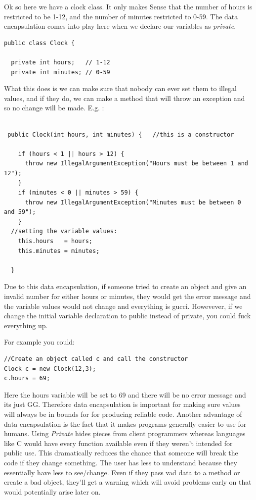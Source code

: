 \documentclass{article}
\begin{document}
Ok so here we have a clock class. It only makes Sense that the number of hours is restricted to be 1-12, and the
number of minutes restricted to 0-59. The data encapsulation comes into play here when we declare our variables 
as \emph{private}. 

\begin{lstlisting}
public class Clock {

  private int hours;   // 1-12
  private int minutes; // 0-59
\end{lstlisting}

What this does is we can make sure that nobody can ever set them to illegal values, and if they do, we can
make a method that will throw an exception and so no change will be made. E.g. :

\begin{lstlisting}

 public Clock(int hours, int minutes) {   //this is a constructor

    if (hours < 1 || hours > 12) {
      throw new IllegalArgumentException("Hours must be between 1 and 12");
    }
    if (minutes < 0 || minutes > 59) {
      throw new IllegalArgumentException("Minutes must be between 0 and 59");
    }
  //setting the variable values:
    this.hours   = hours;	
    this.minutes = minutes;
  
  }       
\end{lstlisting}

Due to this data encapsulation, if someone tried to create an object and give an invalid number for either hours
or minutes, they would get the error message and the variable values would not change and everything is gucci. 
Howevever, if we change the initial variable declaration to public instead of private, you could fuck everything up.

For example you could:

\begin{lstlisting}
//Create an object called c and call the constructor
Clock c = new Clock(12,3);
c.hours = 69;
\end{lstlisting}

Here the hours variable will be set to 69 and there will be no error message and its just GG.
Therefore data encapsulation is important for making sure values will always be in bounds for for producing reliable
code.
\newline
\newline
Another advantage of data encapsulation is the fact that it makes programs generally easier to use for humans. Using 
\emph{Private} hides pieces from client programmers whereas languages like C would have every function available even
if they weren't intended for public use. This dramatically reduces the chance that someone will break the code if they
change something. The user has less to understand because they essentially have less to see/change. Even if they pass
vad data to a method or create a bad object, they'll get a warning which will avoid problems early on that would 
potentially arise later on.
\end{document}
